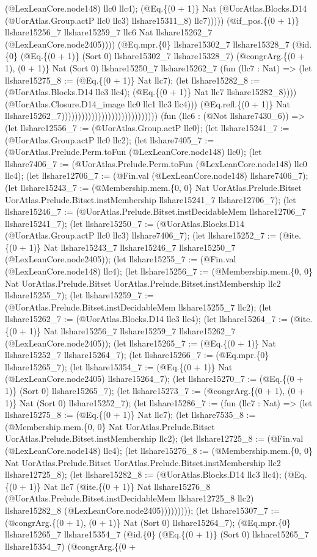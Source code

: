 \documentclass[11pt]{article}
\begin{document}
(@LexLeanCore.node148) llc0 llc4); (@Eq.\{(0 + 1)\} Nat (@UorAtlas.Blocks.D14 (@UorAtlas.Group.actP llc0 llc3) llshare15311\_8) llc7))))) (@if\_pos.\{(0 + 1)\} llshare15256\_7 llshare15259\_7 llc6 Nat llshare15262\_7 (@LexLeanCore.node2405)))) (@Eq.mpr.\{0\} llshare15302\_7 llshare15328\_7 (@id.\{0\} (@Eq.\{(0 + 1)\} (Sort 0) llshare15302\_7 llshare15328\_7) (@congrArg.\{(0 + 1), (0 + 1)\} Nat (Sort 0) llshare15250\_7 llshare15262\_7 (fun (llc7 : Nat) => (let llshare15275\_8 := (@Eq.\{(0 + 1)\} Nat llc7); (let llshare15282\_8 := (@UorAtlas.Blocks.D14 llc3 llc4); (@Eq.\{(0 + 1)\} Nat llc7 llshare15282\_8)))) (@UorAtlas.Closure.D14\_image llc0 llc1 llc3 llc4))) (@Eq.refl.\{(0 + 1)\} Nat llshare15262\_7))))))))))))))))))))))))))))) (fun (llc6 : (@Not llshare7430\_6)) => (let llshare12556\_7 := (@UorAtlas.Group.actP llc0); (let llshare15241\_7 := (@UorAtlas.Group.actP llc0 llc2); (let llshare7405\_7 := (@UorAtlas.Prelude.Perm.toFun (@LexLeanCore.node148) llc0); (let llshare7406\_7 := (@UorAtlas.Prelude.Perm.toFun (@LexLeanCore.node148) llc0 llc4); (let llshare12706\_7 := (@Fin.val (@LexLeanCore.node148) llshare7406\_7); (let llshare15243\_7 := (@Membership.mem.\{0, 0\} Nat UorAtlas.Prelude.Bitset UorAtlas.Prelude.Bitset.instMembership llshare15241\_7 llshare12706\_7); (let llshare15246\_7 := (@UorAtlas.Prelude.Bitset.instDecidableMem llshare12706\_7 llshare15241\_7); (let llshare15250\_7 := (@UorAtlas.Blocks.D14 (@UorAtlas.Group.actP llc0 llc3) llshare7406\_7); (let llshare15252\_7 := (@ite.\{(0 + 1)\} Nat llshare15243\_7 llshare15246\_7 llshare15250\_7 (@LexLeanCore.node2405)); (let llshare15255\_7 := (@Fin.val (@LexLeanCore.node148) llc4); (let llshare15256\_7 := (@Membership.mem.\{0, 0\} Nat UorAtlas.Prelude.Bitset UorAtlas.Prelude.Bitset.instMembership llc2 llshare15255\_7); (let llshare15259\_7 := (@UorAtlas.Prelude.Bitset.instDecidableMem llshare15255\_7 llc2); (let llshare15262\_7 := (@UorAtlas.Blocks.D14 llc3 llc4); (let llshare15264\_7 := (@ite.\{(0 + 1)\} Nat llshare15256\_7 llshare15259\_7 llshare15262\_7 (@LexLeanCore.node2405)); (let llshare15265\_7 := (@Eq.\{(0 + 1)\} Nat llshare15252\_7 llshare15264\_7); (let llshare15266\_7 := (@Eq.mpr.\{0\} llshare15265\_7); (let llshare15354\_7 := (@Eq.\{(0 + 1)\} Nat (@LexLeanCore.node2405) llshare15264\_7); (let llshare15270\_7 := (@Eq.\{(0 + 1)\} (Sort 0) llshare15265\_7); (let llshare15273\_7 := (@congrArg.\{(0 + 1), (0 + 1)\} Nat (Sort 0) llshare15252\_7); (let llshare15286\_7 := (fun (llc7 : Nat) => (let llshare15275\_8 := (@Eq.\{(0 + 1)\} Nat llc7); (let llshare7535\_8 := (@Membership.mem.\{0, 0\} Nat UorAtlas.Prelude.Bitset UorAtlas.Prelude.Bitset.instMembership llc2); (let llshare12725\_8 := (@Fin.val (@LexLeanCore.node148) llc4); (let llshare15276\_8 := (@Membership.mem.\{0, 0\} Nat UorAtlas.Prelude.Bitset UorAtlas.Prelude.Bitset.instMembership llc2 llshare12725\_8); (let llshare15282\_8 := (@UorAtlas.Blocks.D14 llc3 llc4); (@Eq.\{(0 + 1)\} Nat llc7 (@ite.\{(0 + 1)\} Nat llshare15276\_8 (@UorAtlas.Prelude.Bitset.instDecidableMem llshare12725\_8 llc2) llshare15282\_8 (@LexLeanCore.node2405))))))))); (let llshare15307\_7 := (@congrArg.\{(0 + 1), (0 + 1)\} Nat (Sort 0) llshare15264\_7); (@Eq.mpr.\{0\} llshare15265\_7 llshare15354\_7 (@id.\{0\} (@Eq.\{(0 + 1)\} (Sort 0) llshare15265\_7 llshare15354\_7) (@congrArg.\{(0 + 
\end{document}
